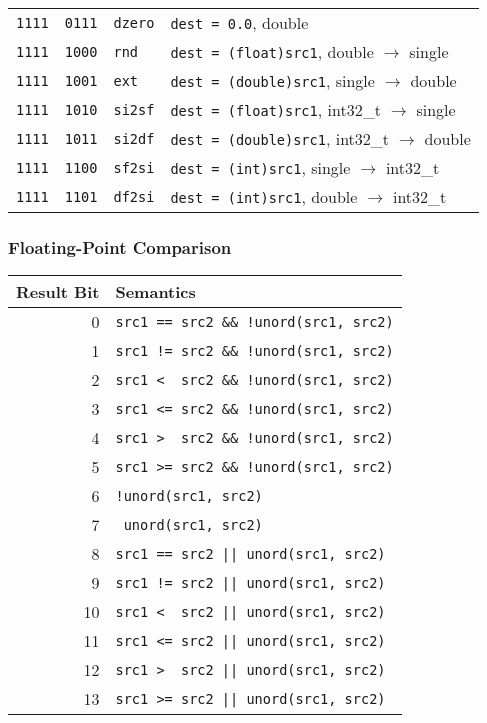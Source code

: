 \documentclass[10pt,DIV12]{scrartcl}
\begin{document}
\begin{tabular}{ccll}
\texttt{1111} & \texttt{0111} & \texttt{dzero} & \texttt{dest = 0.0}, double \\
\texttt{1111} & \texttt{1000} & \texttt{rnd} & \texttt{dest = (float)src1}, double $\rightarrow$ single \\
\texttt{1111} & \texttt{1001} & \texttt{ext} & \texttt{dest = (double)src1}, single $\rightarrow$ double \\
\texttt{1111} & \texttt{1010} & \texttt{si2sf} & \texttt{dest = (float)src1}, int32\_t $\rightarrow$ single \\
\texttt{1111} & \texttt{1011} & \texttt{si2df} & \texttt{dest = (double)src1}, int32\_t $\rightarrow$ double \\
\texttt{1111} & \texttt{1100} & \texttt{sf2si} & \texttt{dest = (int)src1}, single $\rightarrow$ int32\_t \\
\texttt{1111} & \texttt{1101} & \texttt{df2si} & \texttt{dest = (int)src1}, double $\rightarrow$ int32\_t \\
\bottomrule
\end{tabular}

\subsubsection{Floating-Point Comparison}
\label{sec:fcmp}

\begin{tabular}{rl}
\toprule
Result Bit & Semantics \\
\midrule
0 & \texttt{src1 == src2 \&\& !unord(src1, src2)} \\
1 & \texttt{src1 != src2 \&\& !unord(src1, src2)} \\
2 & \texttt{src1 <\ \ src2 \&\& !unord(src1, src2)} \\
3 & \texttt{src1 <= src2 \&\& !unord(src1, src2)} \\
4 & \texttt{src1 >\ \ src2 \&\& !unord(src1, src2)} \\
5 & \texttt{src1 >= src2 \&\& !unord(src1, src2)} \\
6 & \texttt{!unord(src1, src2)} \\
7 & \texttt{\ unord(src1, src2)} \\
8 & \texttt{src1 == src2 || unord(src1, src2)} \\
9 & \texttt{src1 != src2 || unord(src1, src2)} \\
10 & \texttt{src1 <\ \  src2 || unord(src1, src2)} \\
11 & \texttt{src1 <= src2 || unord(src1, src2)} \\
12 & \texttt{src1 >\ \  src2 || unord(src1, src2)} \\
13 & \texttt{src1 >= src2 || unord(src1, src2)} \\
\bottomrule
\end{tabular}
\end{document}
